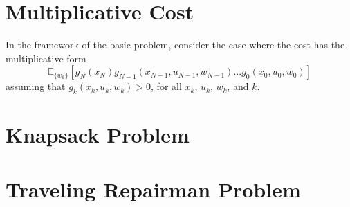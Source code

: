 \documentclass[11pt, oneside]{article}   	%
\begin{document}
\section{Multiplicative Cost}
In the framework of the basic problem, consider the case where the cost has the multiplicative form $$\mathbb{E}_{\{w_k\}}[g_N(x_N) g_{N-1}(x_{N-1}, u_{N-1}, w_{N-1})... g_{0}(x_{0}, u_{0}, w_{0})]$$ assuming that $g_{k}(x_{k}, u_{k}, w_{k}) > 0
$, for all $x_k$, $u_k$, $w_k$, and $k$. \\

\section{Knapsack Problem}

\section{Traveling Repairman Problem}
\end{document}
